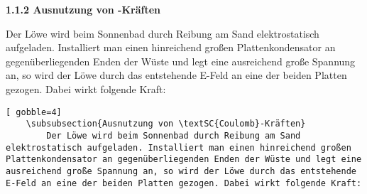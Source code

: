 \begin{frame}[fragile]
	\Losung
	\begin{outputbox}
		{ \large\textbf{1.1.2 Ausnutzung von -Kräften}}
		
		Der Löwe wird beim Sonnenbad durch Reibung am Sand elektrostatisch aufgeladen. Installiert man einen hinreichend großen Plattenkondensator an gegenüberliegenden Enden der Wüste und legt eine ausreichend große Spannung an, so wird der Löwe durch das entstehende E-Feld an eine der beiden Platten gezogen. Dabei wirkt folgende Kraft: 
	\end{outputbox}

	\Code
	\begin{lstlisting}[ gobble=4]
	\subsubsection{Ausnutzung von \textSC{Coulomb}-Kräften}
	    Der Löwe wird beim Sonnenbad durch Reibung am Sand elektrostatisch aufgeladen. Installiert man einen hinreichend großen Plattenkondensator an gegenüberliegenden Enden der Wüste und legt eine ausreichend große Spannung an, so wird der Löwe durch das entstehende E-Feld an eine der beiden Platten gezogen. Dabei wirkt folgende Kraft: 
	\end{lstlisting}
\end{frame}
